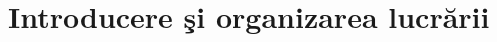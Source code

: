 \documentclass[oneside, 12pt]{book}
\begin{document}




\chapter*{Introducere şi organizarea lucrării}
\end{document}
